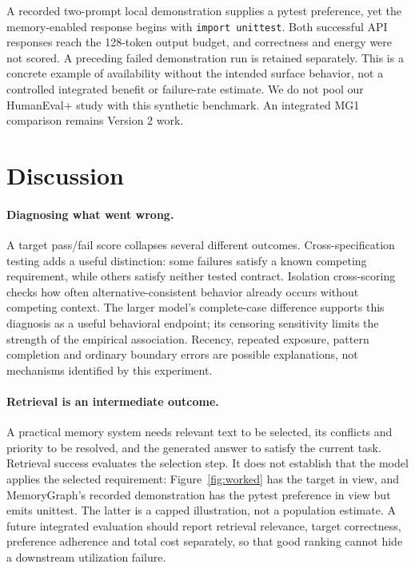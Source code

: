 \documentclass[10pt,a4paper,twocolumn]{article}
\begin{document}
A recorded two-prompt local demonstration supplies a pytest preference, yet
the memory-enabled response begins with \texttt{import unittest}. Both
successful API responses reach the 128-token output budget, and correctness
and energy were not scored. A preceding failed demonstration run is retained separately. This is a concrete example of availability without the intended
surface behavior, not a controlled integrated benefit or failure-rate estimate.
We do not pool our HumanEval+ study with this synthetic benchmark. An
integrated MG1 comparison remains Version 2 work.

\section{Discussion}
\paragraph{Diagnosing what went wrong.}
A target pass/fail score collapses several different outcomes. Cross-specification
testing adds a useful distinction: some failures satisfy a known competing
requirement, while others satisfy neither tested contract. Isolation cross-scoring
checks how often alternative-consistent behavior already occurs without competing
context. The larger model's complete-case difference supports this diagnosis as
a useful behavioral endpoint; its censoring sensitivity limits the strength of
the empirical association. Recency, repeated exposure, pattern completion and
ordinary boundary errors are possible explanations, not mechanisms identified
by this experiment.

\paragraph{Retrieval is an intermediate outcome.}
A practical memory system needs relevant text to be selected, its conflicts and
priority to be resolved, and the generated answer to satisfy the current task.
Retrieval success evaluates the selection step. It does not establish that the
model applies the selected requirement: Figure~\ref{fig:worked} has the target
in view, and MemoryGraph's recorded demonstration has the pytest preference in
view but emits unittest. The latter is a capped illustration, not a population
estimate. A future integrated evaluation should report retrieval relevance,
target correctness, preference adherence and total cost separately, so that
good ranking cannot hide a downstream utilization failure.
\end{document}
